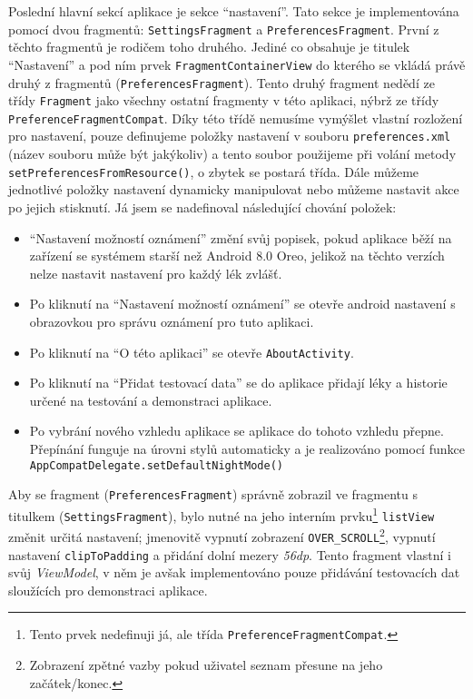 \documentclass[../TakeYourPill.tex]{subfiles}
\begin{document}
Poslední hlavní sekcí aplikace je sekce \enquote{nastavení}. Tato sekce je implementována pomocí dvou fragmentů: \texttt{SettingsFragment} a \texttt{PreferencesFragment}. První z těchto fragmentů je rodičem toho druhého. Jediné co obsahuje je titulek \enquote{Nastavení} a pod ním prvek \texttt{FragmentContainerView} do kterého se vkládá právě druhý z fragmentů (\texttt{PreferencesFragment}). Tento druhý fragment nedědí ze třídy \texttt{Fragment} jako všechny ostatní fragmenty v této aplikaci, nýbrž ze třídy \texttt{PreferenceFragmentCompat}. Díky této třídě nemusíme vymýšlet vlastní rozložení pro nastavení, pouze definujeme položky nastavení v souboru \texttt{preferences.xml} (název souboru může být jakýkoliv) a tento soubor použijeme při volání metody \texttt{setPreferencesFromResource()}, o zbytek se postará třída. Dále můžeme jednotlivé položky nastavení dynamicky manipulovat nebo můžeme nastavit akce po jejich stisknutí. Já jsem se nadefinoval následující chování položek:
\begin{itemize}
  \item \enquote{Nastavení možností oznámení} změní svůj popisek, pokud aplikace běží na zařízení se systémem starší než Android 8.0 Oreo, jelikož na těchto verzích nelze nastavit nastavení pro každý lék zvlášť.
  \item Po kliknutí na \enquote{Nastavení možností oznámení} se otevře android nastavení s obrazovkou pro správu oznámení pro tuto aplikaci.
  \item Po kliknutí na \enquote{O této aplikaci} se otevře \texttt{AboutActivity}.
  \item Po kliknutí na \enquote{Přidat testovací data} se do aplikace přidají léky a historie určené na testování a demonstraci aplikace.
  \item Po vybrání nového vzhledu aplikace se aplikace do tohoto vzhledu přepne. \label{sec:theme} Přepínání funguje na úrovni stylů automaticky a je realizováno pomocí funkce \texttt{AppCompatDelegate.setDefaultNightMode()}
\end{itemize}

Aby se fragment (\texttt{PreferencesFragment}) správně zobrazil ve fragmentu s titulkem (\texttt{SettingsFragment}), bylo nutné na jeho interním prvku\footnote{Tento prvek nedefinuji já, ale třída \texttt{PreferenceFragmentCompat}.} \texttt{listView} změnit určitá nastavení; jmenovitě vypnutí zobrazení \texttt{OVER\_SCROLL}\footnote{Zobrazení zpětné vazby pokud uživatel seznam přesune na jeho začátek/konec.}, vypnutí nastavení \texttt{clipToPadding} a přidání dolní mezery \textit{56dp}.
Tento fragment vlastní i svůj \textit{ViewModel}, v něm je avšak implementováno pouze přidávání testovacích dat sloužících pro demonstraci aplikace.
\end{document}
